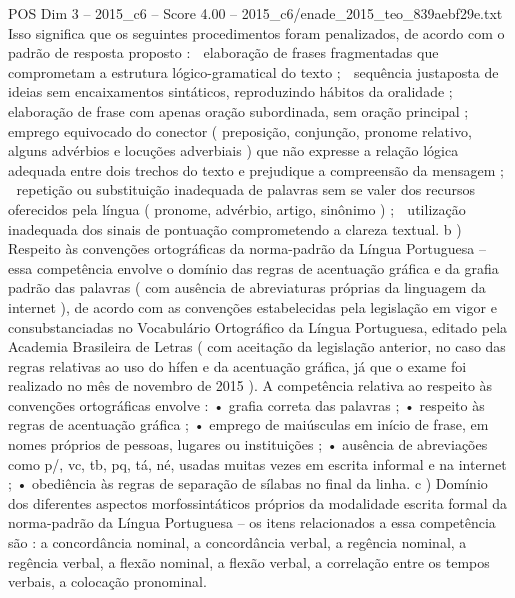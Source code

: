 \begin{textsample}{POS Dim 3 – 2015\_c6 – Score 4.00 – 2015\_c6/enade\_2015\_teo\_839aebf29e.txt}
Isso significa que os seguintes procedimentos foram penalizados, de acordo com o padrão de resposta proposto :  elaboração de frases fragmentadas que comprometam a estrutura lógico-gramatical do texto ;  sequência justaposta de ideias sem encaixamentos sintáticos, reproduzindo hábitos da oralidade ;  elaboração de frase com apenas oração subordinada, sem oração principal ;  emprego equivocado do conector ( preposição, conjunção, pronome relativo, alguns advérbios e locuções adverbiais ) que não expresse a relação lógica adequada entre dois trechos do texto e prejudique a compreensão da mensagem ;  repetição ou substituição inadequada de palavras sem se valer dos recursos oferecidos pela língua ( pronome, advérbio, artigo, sinônimo ) ;  utilização inadequada dos sinais de pontuação comprometendo a clareza textual. b ) Respeito às convenções ortográficas da norma-padrão da Língua Portuguesa – essa competência envolve o domínio das regras de acentuação gráfica e da grafia padrão das palavras ( com ausência de abreviaturas próprias da linguagem da internet ), de acordo com as convenções estabelecidas pela legislação em vigor e consubstanciadas no Vocabulário Ortográfico da Língua Portuguesa, editado pela Academia Brasileira de Letras ( com aceitação da legislação anterior, no caso das regras relativas ao uso do hífen e da acentuação gráfica, já que o exame foi realizado no mês de novembro de 2015 ).
A competência relativa ao respeito às convenções ortográficas envolve : • grafia correta das palavras ; • respeito às regras de acentuação gráfica ; • emprego de maiúsculas em início de frase, em nomes próprios de pessoas, lugares ou instituições ; • ausência de abreviações como p/, vc, tb, pq, tá, né, usadas muitas vezes em escrita informal e na internet ; • obediência às regras de separação de sílabas no final da linha. c ) Domínio dos diferentes aspectos morfossintáticos próprios da modalidade escrita formal da norma-padrão da Língua Portuguesa – os itens relacionados a essa competência são : a concordância nominal, a concordância verbal, a regência nominal, a regência verbal, a flexão nominal, a flexão verbal, a correlação entre os tempos verbais, a colocação pronominal.

\end{textsample}
